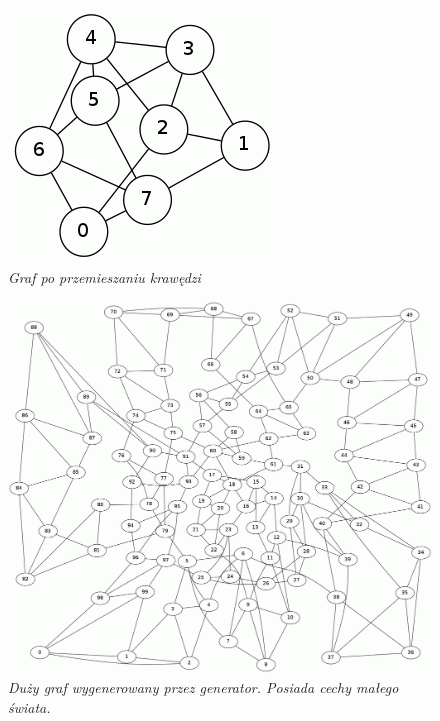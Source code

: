 \documentclass[a4paper, 12pt]{article}
\begin{document}
\begin{figure}[ht]
\begin{minipage}[b]{0.45\linewidth}
\includegraphics[width=\textwidth]{pomieszany.png}
\caption{\em Graf po przemieszaniu krawędzi}
\label{fig:pomiesz}
\end{minipage}
\end{figure}

\begin{figure}[!htbp]
\centering
\includegraphics[scale=0.23]{biggraph.png}
\caption{\em Duży graf wygenerowany przez generator. Posiada cechy małego świata.}
\label{fig:bignetwork}
\end{figure}
\end{document}
